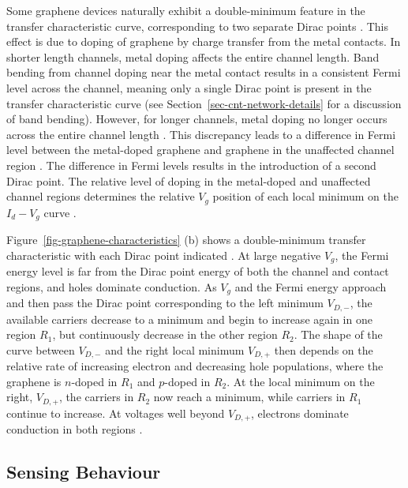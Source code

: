 \documentclass[
  a4paper,
]{scrbook}
\begin{document}
Some graphene devices naturally exhibit a double-minimum feature in the
transfer characteristic curve, corresponding to two separate Dirac
points \autocite{Bartolomeo2011,Feng2014,Zhang2015,Kireev2017,Peng2018}.
This effect is due to doping of graphene by charge transfer from the
metal contacts. In shorter length channels, metal doping affects the
entire channel length. Band bending from channel doping near the metal
contact results in a consistent Fermi level across the channel, meaning
only a single Dirac point is present in the transfer characteristic
curve (see Section~\ref{sec-cnt-network-details} for a discussion of
band bending). However, for longer channels, metal doping no longer
occurs across the entire channel length
\autocite{Bartolomeo2011,Peng2018}. This discrepancy leads to a
difference in Fermi level between the metal-doped graphene and graphene
in the unaffected channel region
\autocite{Bartolomeo2011,Feng2014,Peng2018,Zhang2015}. The difference in
Fermi levels results in the introduction of a second Dirac point. The
relative level of doping in the metal-doped and unaffected channel
regions determines the relative \(V_g\) position of each local minimum
on the \(I_d - V_g\) curve \autocite{Bartolomeo2011,Peng2018,Zhang2015}.

Figure~\ref{fig-graphene-characteristics} (b) shows a double-minimum
transfer characteristic with each Dirac point indicated
\autocite{Peng2018}. At large negative \(V_g\), the Fermi energy level
is far from the Dirac point energy of both the channel and contact
regions, and holes dominate conduction. As \(V_g\) and the Fermi energy
approach and then pass the Dirac point corresponding to the left minimum
\(V_{D,-}\), the available carriers decrease to a minimum and begin to
increase again in one region \(R_1\), but continuously decrease in the
other region \(R_2\). The shape of the curve between \(V_{D,-}\) and the
right local minimum \(V_{D,+}\) then depends on the relative rate of
increasing electron and decreasing hole populations, where the graphene
is \(n\)-doped in \(R_1\) and \(p\)-doped in \(R_2\). At the local
minimum on the right, \(V_{D,+}\), the carriers in \(R_2\) now reach a
minimum, while carriers in \(R_1\) continue to increase. At voltages
well beyond \(V_{D,+}\), electrons dominate conduction in both regions
\autocite{Bartolomeo2011,Zhang2015,Peng2018}.

\hypertarget{sensing-behaviour}{%
\subsection{Sensing Behaviour}\label{sensing-behaviour}}
\end{document}
